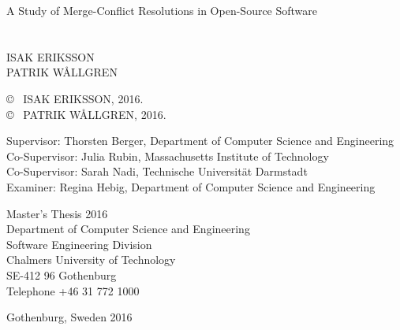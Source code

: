 \newpage
\thispagestyle{plain}
\vspace*{4.5cm}
A Study of Merge-Conflict Resolutions in Open-Source Software\\
\\\\
ISAK ERIKSSON \setlength{\parskip}{1cm}\\
PATRIK WÅLLGREN \setlength{\parskip}{1cm}

\copyright ~ ISAK ERIKSSON, 2016. \setlength{\parskip}{1cm}\\
\copyright ~ PATRIK WÅLLGREN, 2016. \setlength{\parskip}{1cm}

Supervisor: Thorsten Berger, Department of Computer Science and Engineering\\
Co-Supervisor: Julia Rubin, Massachusetts Institute of Technology\\
Co-Supervisor: Sarah Nadi, Technische Universität Darmstadt\\
Examiner: Regina Hebig, Department of Computer Science and Engineering\setlength{\parskip}{1cm}

Master's Thesis 2016\\	%
Department of Computer Science and Engineering\\
Software Engineering Division\\
Chalmers University of Technology\\
SE-412 96 Gothenburg\\
Telephone +46 31 772 1000 \setlength{\parskip}{0.5cm}

\vfill

Gothenburg, Sweden 2016

